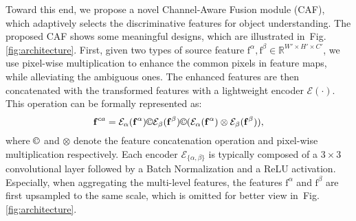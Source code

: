 \documentclass[journal]{IEEEtran}
\newcommand{\figref}[1]{Fig. \ref{#1}}
\newcommand{\mc}[1]{\mathcal{#1}}
\newcommand{\br}[1]{\bm{\mathrm{#1}}}
\begin{document}
Toward this end, we propose a novel Channel-Aware Fusion module (CAF), which adaptively selects the discriminative features for object understanding.
The proposed CAF shows some meaningful designs, which are illustrated in~\figref{fig:architecture}. First, given two types of source feature $\br{f}^\alpha, \br{f}^\beta \in \mathbb{R}^{W'\times H'\times C'}$, we use pixel-wise multiplication to enhance the common pixels in feature maps, while alleviating the ambiguous ones. The enhanced features are then concatenated with the transformed features with a lightweight encoder $\mc{E}(\cdot)$. This operation can be formally represented as:
\begin{equation} \label{eq:eq feature fusion process1}
\br{f}^{ca} = \mc{E}_\alpha(\br{f}^\alpha) \copyright \mc{E}_\beta(\br{f}^\beta) \copyright (\mc{E}_\alpha(\br{f}^\alpha) \otimes \mc{E}_\beta(\br{f}^\beta)),
\end{equation}
where $\copyright$ and $\otimes$ denote the feature concatenation operation and pixel-wise multiplication respectively. Each encoder $\mc{E}_{\{\alpha,\beta\}}$ is typically composed of a $3\times 3$ convolutional layer followed by a Batch Normalization and a ReLU activation.
Especially, when aggregating the multi-level features, the features $\br{f}^\alpha$ and $\br{f}^\beta$ are first upsampled to the same scale, which is omitted for better view in~\figref{fig:architecture}.
\end{document}
